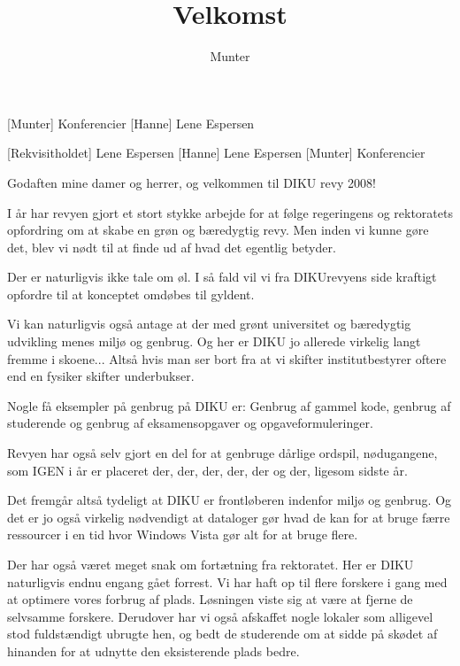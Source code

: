 \documentclass[a4paper,11pt]{article}
\title{Velkomst}
\author{Munter}
\begin{document}
\maketitle

\begin{roles}
[Munter] Konferencier
[Hanne] Lene Espersen
\end{roles}

\begin{props}
[Rekvisitholdet] Lene Espersen
[Hanne] Lene Espersen
[Munter] Konferencier
\end{props}

  
\begin{sketch}


 Godaften mine damer og herrer, og velkommen til DIKU revy 2008!

 I år har revyen gjort et stort stykke arbejde for at følge regeringens og rektoratets opfordring om at skabe 
en grøn og bæredygtig revy. Men inden vi kunne gøre det, blev vi nødt til at finde ud af hvad det egentlig betyder.

 Der er naturligvis ikke tale om øl. I så fald vil vi fra DIKUrevyens side kraftigt opfordre til at 
konceptet omdøbes til gyldent. 

 Vi kan naturligvis også antage at der med grønt universitet og bæredygtig udvikling menes miljø og genbrug. 
Og her er DIKU jo allerede virkelig langt fremme i skoene... Altså hvis man ser bort fra at vi skifter institutbestyrer oftere end en fysiker skifter underbukser.

 Nogle få eksempler på genbrug på DIKU er: Genbrug af gammel kode, genbrug af studerende og genbrug af 
eksamensopgaver og opgaveformuleringer.

 Revyen har også selv gjort en del for at genbruge dårlige ordspil, nødugangene, som IGEN i år er placeret 
der, der, der, der, der og der, ligesom sidste år.

 Det fremgår altså tydeligt at DIKU er frontløberen indenfor miljø og genbrug. Og det er jo også virkelig 
nødvendigt at dataloger gør hvad de kan for at bruge færre ressourcer i en tid hvor Windows Vista gør alt for at bruge 
flere.

 Der har også været meget snak om fortætning fra rektoratet.
 Her er DIKU naturligvis endnu engang gået forrest. Vi har haft op til flere forskere i gang med at optimere vores forbrug af plads. Løsningen viste sig at være at fjerne de selvsamme forskere.
 Derudover har vi også afskaffet nogle lokaler som alligevel stod fuldstændigt ubrugte hen, og bedt de studerende om at sidde på skødet af hinanden for at udnytte den eksisterende plads bedre.


\end{sketch}
\end{document}
